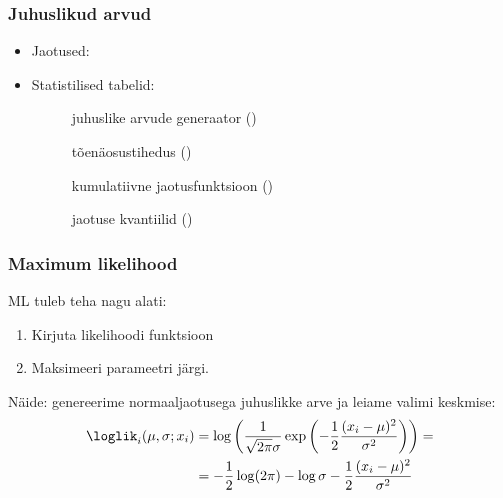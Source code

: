 \documentclass[pdftex]{beamer}
\begin{document}
\begin{frame}
  \frametitle{Juhuslikud arvud}
  \begin{itemize}
  \item Jaotused:
    \pause
  \item Statistilised tabelid:
    \begin{description}
    \item[] juhuslike arvude generaator ()
    \item[] tõenäosustihedus ()
    \item[] kumulatiivne jaotusfunktsioon ()
    \item[] jaotuse kvantiilid ()
    \end{description}
  \end{itemize}
\end{frame}

\begin{frame}
  \frametitle{Maximum likelihood}
  ML tuleb teha nagu alati:
  \begin{enumerate}
  \item Kirjuta likelihoodi funktsioon
  \item Maksimeeri parameetri järgi.
  \end{enumerate}
  Näide: genereerime normaaljaotusega juhuslikke arve ja leiame valimi
  keskmise:
  \begin{align}
    \loglik_i(\mu, \sigma; x_i) 
    &=
    \log \left(
      \frac{1}{\sqrt{2\pi}\sigma}
      \exp \left(
        - \frac{1}{2}
        \frac{(x_i - \mu)^2}{\sigma^2}
      \right)
    \right) =
    \\
    &=
    -\frac{1}{2} \log(2\pi)
    - \log \sigma
    - \frac{1}{2}
    \frac{(x_i - \mu)^2}{\sigma^2}
  \end{align}
\end{frame}
\end{document}
